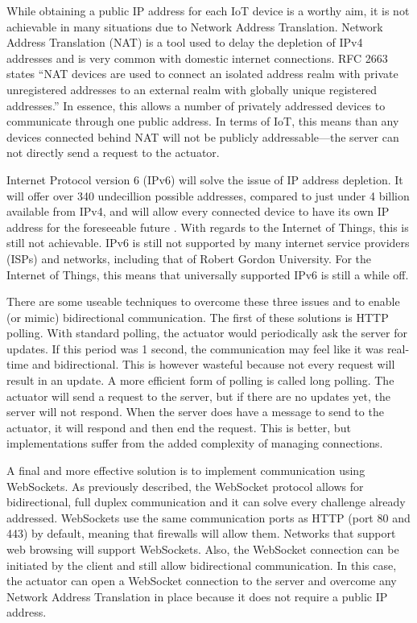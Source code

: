       While obtaining a public IP address for each IoT device is a worthy aim, it is not achievable in many situations due to Network Address Translation. Network Address Translation (NAT) is a tool used to delay the depletion of IPv4 addresses and is very common with domestic internet connections. RFC 2663 \citep{rfc2663} states ``NAT devices are used to connect an isolated address realm with private unregistered addresses to an external realm with globally unique registered addresses.'' In essence, this allows a number of privately addressed devices to communicate through one public address. In terms of IoT, this means than any devices connected behind NAT will not be publicly addressable---the server can not directly send a request to the actuator.

      Internet Protocol version 6 (IPv6) will solve the issue of IP address depletion. It will offer over 340 undecillion possible addresses, compared to just under 4 billion available from IPv4, and will allow every connected device to have its own IP address for the foreseeable future \citep{ipv6:2008}. With regards to the Internet of Things, this is still not achievable. IPv6 is still not supported by many internet service providers (ISPs) and networks, including that of Robert Gordon University. For the Internet of Things, this means that universally supported IPv6 is still a while off.

      There are some useable techniques to overcome these three issues and to enable (or mimic) bidirectional communication. The first of these solutions is HTTP polling. With standard polling, the actuator would periodically ask the server for updates. If this period was 1 second, the communication may feel like it was real-time and bidirectional. This is however wasteful because not every request will result in an update. A more efficient form of polling is called long polling. The actuator will send a request to the server, but if there are no updates yet, the server will not respond. When the server does have a message to send to the actuator, it will respond and then end the request. This is better, but implementations suffer from the added complexity of managing connections.

      A final and more effective solution is to implement communication using WebSockets. As previously described, the WebSocket protocol allows for bidirectional, full duplex communication and it can solve every challenge already addressed. WebSockets use the same communication ports as HTTP (port 80 and 443) by default, meaning that firewalls will allow them. Networks that support web browsing will support WebSockets. Also, the WebSocket connection can be initiated by the client and still allow bidirectional communication. In this case, the actuator can open a WebSocket connection to the server and overcome any Network Address Translation in place because it does not require a public IP address.

